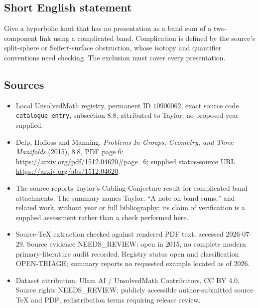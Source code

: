 \documentclass[11pt]{article}
\begin{document}
\subsection{Short English statement}
Give a hyperbolic knot that has no presentation as a band sum of a two-component link using a complicated band. Complication is defined by the source's split-sphere or Seifert-surface obstruction, whose isotopy and quantifier conventions need checking. The exclusion must cover every presentation.
\subsection{Sources}
\begin{itemize}
\item Local UnsolvedMath registry, permanent ID \(10900062\), exact source code \texttt{catalogue entry}, subsection 8.8, attributed to Taylor; no proposed year supplied.
\item Delp, Hoffoss and Manning, \emph{Problems In Groups, Geometry, and Three-Manifolds} (2015), 8.8, PDF page 6: \url{https://arxiv.org/pdf/1512.04620#page=6}; supplied status-source URL \url{https://arxiv.org/abs/1512.04620}.
\item The source reports Taylor's Cabling-Conjecture result for complicated band attachments. The summary names Taylor, ``A note on band sums,'' and related work, without year or full bibliography; its claim of verification is a supplied assessment rather than a check performed here.
\item Source-TeX extraction checked against rendered PDF text, accessed 2026-07-29. Source evidence NEEDS\_REVIEW: open in 2015, no complete modern primary-literature audit recorded. Registry status open and classification OPEN-TRIAGE; summary reports no requested example located as of 2026.
\item Dataset attribution: Ulam AI / UnsolvedMath Contributors, CC BY 4.0. Source rights NEEDS\_REVIEW: publicly accessible author-submitted source TeX and PDF, redistribution terms requiring release review.
\end{itemize}
\end{document}

